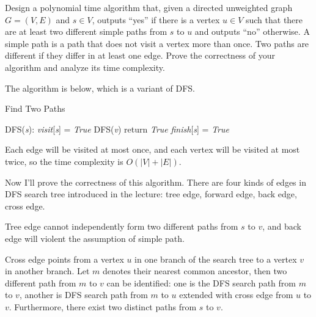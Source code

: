 \documentclass{oxmathproblems}
\begin{document}
\begin{questions}

\miquestion[25]
Design a polynomial time algorithm that, given a directed unweighted graph $G=(V,E)$ and $s\in V$, outputs ``yes'' if there is a vertex $u\in V$ such that there are at least two different simple paths from $s$ to $u$ and outputs ``no'' otherwise.
A simple path is a path that does not visit a vertex more than once.
Two paths are different if they differ in at least one edge.
Prove the correctness of your algorithm and analyze its time complexity.

\begin{Solution}

The algorithm is below, which is a variant of DFS. 

\begin{algorithm}[H]
        \caption{Find Two Paths}
        \begin{algorithmic}[1]
            \renewcommand{\algorithmicrequire}{\textbf{function}}
            \REQUIRE DFS(\emph{s}):
            \STATE \textit{visit}[\textit{s}] = \textit{True}
                \STATE DFS(\textit{v})
                \STATE return \textit{True}
                \ENDIF
            \ENDFOR
            \STATE \textit{finish}[\textit{s}] = \textit{True}
        \end{algorithmic}
    \end{algorithm}

Each edge will be visited at most once, and each vertex will be visited at most twice, so the time complexity is $O(|V|+|E|)$.

Now I'll prove the correctness of this algorithm. There are four kinds of edges in DFS search tree introduced in the lecture: tree edge, forward edge, back edge, cross edge. 

Tree edge cannot independently form two different paths from $s$ to $v$, and back edge will violent the assumption of simple path. 

Cross edge points from a vertex $u$ in one branch of the search tree to a vertex $v$ in another branch. Let $m$ denotes their nearest common ancestor, then two different path from $m$ to $v$ can be identified: one is the DFS search path from $m$ to $v$, another is DFS search path from $m$ to $u$ extended with cross edge from $u$ to $v$. Furthermore, there exist two distinct paths from $s$ to $v$.


\end{Solution}
\end{questions}
\end{document}
